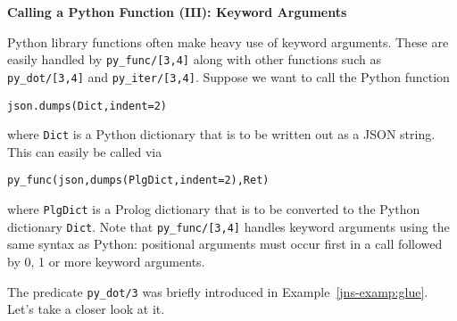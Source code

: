 \begin{example} \rm {\bf Calling a Python Function (III): Keyword Arguments} \label{ex:jns-kewords}
  
\noindent
Python library functions often make heavy use of keyword arguments.
These are easily handled by {\tt py\_func/[3,4]} along with other \janus{}
functions such as {\tt py\_dot/[3,4]} and {\tt py\_iter/[3,4]}.  Suppose we
want to call the Python function

{\tt json.dumps(Dict,indent=2)}

\noindent
where {\tt Dict} is a Python dictionary that is to be written out as a
JSON string.  This can easily be called via

{\tt py\_func(json,dumps(PlgDict,indent=2),Ret)}

\noindent
where {\tt PlgDict} is a Prolog dictionary that is to be converted to
the Python dictionary {\tt Dict}. Note that {\tt py\_func/[3,4]}
handles keyword arguments using the same syntax as Python: positional
arguments must occur first in a call followed by 0, 1 or more keyword
arguments.
\end{example}


The \janus{} predicate {\tt py\_dot/3} was briefly introduced in
Example~\ref{jns-examp:glue}.  Let's take a closer look at it.

